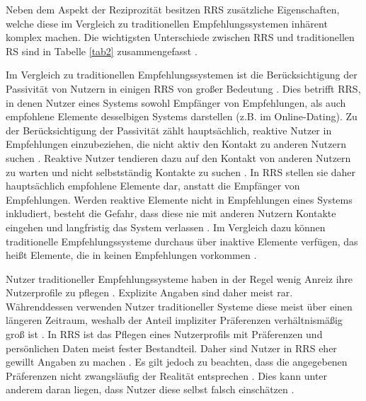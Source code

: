 Neben dem Aspekt der Reziprozität besitzen \ac{RRS} zusätzliche Eigenschaften, welche diese im Vergleich zu traditionellen Empfehlungssystemen inhärent komplex machen\cite[S. 2429]{palomares:inproceedings}\cite[S. 35]{li:inproceedings}\cite[S. 207]{pizzato:2010}.
Die wichtigsten Unterschiede zwischen \ac{RRS} und traditionellen \ac{RS} sind in Tabelle \ref{tab2} zusammengefasst \cite[S. 546]{koprinska:inbook}.

Im Vergleich zu traditionellen Empfehlungssystemen ist die Berücksichtigung der Passivität von Nutzern in einigen \ac{RRS} von großer Bedeutung \cite[S. 35]{li:inproceedings}.
Dies betrifft \ac{RRS}, in denen Nutzer eines Systems sowohl Empfänger von Empfehlungen, als auch empfohlene Elemente desselbigen Systems darstellen (z.B. im Online-Dating).
Zu der Berücksichtigung der Passivität zählt hauptsächlich, reaktive Nutzer in Empfehlungen einzubeziehen, die nicht aktiv den Kontakt zu anderen Nutzern suchen \cite[S. 459]{pizzato:2013}.
Reaktive Nutzer tendieren dazu auf den Kontakt von anderen Nutzern zu warten und nicht selbstständig Kontakte zu suchen \cite[S. 455]{pizzato:2013}.
In \ac{RRS} stellen sie daher hauptsächlich empfohlene Elemente dar, anstatt die Empfänger von Empfehlungen.
Werden reaktive Elemente nicht in Empfehlungen eines Systems inkludiert, besteht die Gefahr, dass diese nie mit anderen Nutzern Kontakte eingehen und langfristig das System verlassen \cite[S. 35]{li:inproceedings}.
Im Vergleich dazu können traditionelle Empfehlungssysteme durchaus über inaktive Elemente verfügen, das heißt Elemente, die in keinen Empfehlungen vorkommen \cite[S. 208]{pizzato:2010}.

Nutzer traditioneller Empfehlungssysteme haben in der Regel wenig Anreiz ihre Nutzerprofile zu pflegen \cite[S. 546]{koprinska:inbook}.
Explizite Angaben sind daher meist rar.
Währenddessen verwenden Nutzer traditioneller Systeme diese meist über einen längeren Zeitraum, weshalb der Anteil impliziter Präferenzen verhältnismäßig groß ist \cite[S. 208]{pizzato:2010}.
In \ac{RRS} ist das Pflegen eines Nutzerprofils mit Präferenzen und persönlichen Daten meist fester Bestandteil.
Daher sind Nutzer in \ac{RRS} eher gewillt Angaben zu machen \cite[S. 208]{pizzato:2010}.
Es gilt jedoch zu beachten, dass die angegebenen Präferenzen nicht zwangsläufig der Realität entsprechen \cite[S. 457]{pizzato:2013}.
Dies kann unter anderem daran liegen, dass Nutzer diese selbst falsch einschätzen \cite[S. 457]{pizzato:2013}.

